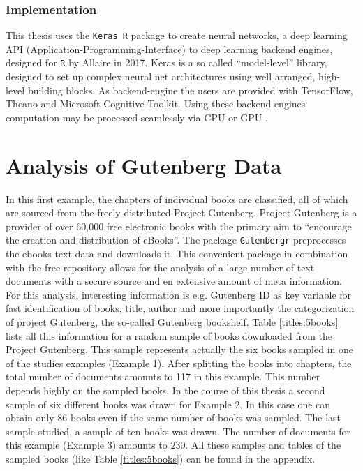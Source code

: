 \documentclass[11pt,a4paper]{article}
\begin{document}
\subsubsection{Implementation}
This thesis uses the \texttt{Keras R} package to create neural networks, a deep learning API (Application-Programming-Interface) to deep learning backend engines, designed for \texttt{R} by Allaire in 2017. Keras is a so called “model-level” library, designed to set up complex neural net architectures using well arranged, high-level building blocks. As backend-engine the users are provided with TensorFlow, Theano and Microsoft Cognitive Toolkit. Using these backend engines computation may be processed seamlessly via CPU or GPU \cite{Chollet2018}.

\section{Analysis of Gutenberg Data}\label{sec:analysis}

In this first example, the chapters of individual books are classified, all of which are sourced from the freely distributed Project Gutenberg. Project Gutenberg is a provider of over 60,000 free electronic books with the primary aim to “encourage the creation and distribution of eBooks”\cite{ProjectGutenberg}. The package \texttt{Gutenbergr} \cite{gutenbergr} preprocesses the ebooks text data and downloads it. This convenient package in combination with the free repository allows for the analysis of a large number of text documents with a secure source and en extensive amount of meta information. For this analysis, interesting information is e.g. Gutenberg ID as key variable for fast identification of books, title, author and more importantly the categorization of project Gutenberg, the so-called Gutenberg bookshelf. Table \ref{titles:5books} lists all this information for a random sample of books downloaded from the Project Gutenberg. This sample represents actually the six books sampled in one of the studies examples (Example 1). After splitting the books into chapters, the total number of documents amounts to 117 in this example. This number depends highly on the sampled books.  In the course of this thesis a second sample of six different books was drawn for Example 2. In this case one can obtain only $86$ books even if the same number of books was sampled. The last sample studied, a sample of ten books was drawn. The number of documents for this example (Example 3) amounts to $230$. All these samples and tables of the sampled books (like Table \ref{titles:5books}) can be found in the appendix.
\end{document}
